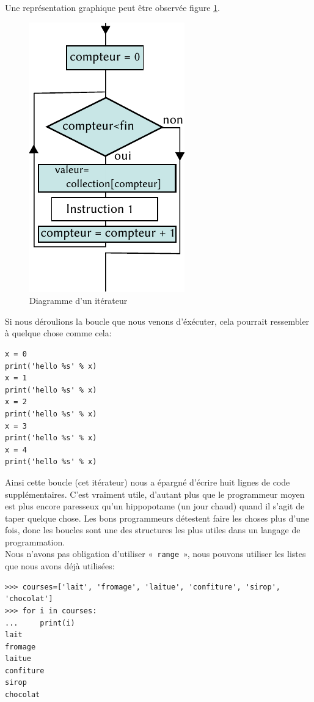 Une représentation graphique peut être observée figure \ref{fig:for}.
\begin{figure}[ht]
\centering
\includegraphics[scale=1.5]{images/for.pdf}
\caption{Diagramme d'un itérateur}
\label{fig:for}
\end{figure}

Si nous déroulions la boucle que nous venons d'éxécuter, cela pourrait ressembler à quelque chose comme cela:

\begin{Verbatim}[frame=single,rulecolor=\color{gray}, label=ne pas saisir]
x = 0
print('hello %s' % x)
x = 1
print('hello %s' % x)
x = 2
print('hello %s' % x)
x = 3
print('hello %s' % x)
x = 4
print('hello %s' % x)
\end{Verbatim}

Ainsi cette boucle (cet itérateur) nous a épargné d'écrire huit lignes de code supplémentaires. C'est vraiment utile, d'autant plus que le programmeur moyen est plus encore paresseux qu'un hippopotame (un jour chaud) quand il s'agit de taper quelque chose. Les bons programmeurs détestent faire les choses plus d'une fois, donc les boucles sont une des structures les plus utiles dans un langage de programmation.\\

Nous n'avons pas obligation d'utiliser « \texttt{range} », nous pouvons utiliser les listes que nous avons déjà utilisées:

\begin{small}
\begin{Verbatim}[frame=single,rulecolor=\color{green}, label=à taper avec attention]
>>> courses=['lait', 'fromage', 'laitue', 'confiture', 'sirop', 'chocolat']
>>> for i in courses:
...     print(i)
lait
fromage
laitue
confiture
sirop
chocolat
\end{Verbatim}
\end{small}

